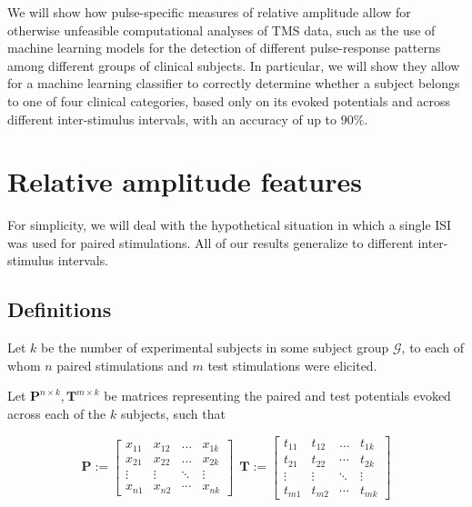 \documentclass{article}
\begin{document}
\begin{multicols}{2}
We will show how pulse-specific measures of relative amplitude allow for
otherwise unfeasible computational analyses of TMS data, such as the use of
machine learning models for the detection of different pulse-response patterns
among different groups of clinical subjects. In particular, we will show they
allow for a machine learning classifier to correctly determine whether a
subject belongs to one of four clinical categories, based only on its evoked
potentials and across different inter-stimulus intervals, with an accuracy of up to
$90\%$.

\section{Relative amplitude features}

For simplicity, we will deal with the hypothetical situation
in which a single ISI was used for paired stimulations. All
of our results generalize to different inter-stimulus intervals.

\subsection{Definitions}

Let $k$ be the number of experimental subjects in some
subject group $\mathcal{G}$, to each of whom $n$ paired stimulations and
$m$ test stimulations were elicited.

\begin{definition}

Let $\textbf{P}^{n \times k}, \textbf{T}^{m\times k}$ be matrices representing
the paired and test potentials evoked across each of the $k$ subjects, such that  

\begin{equation*} \textbf{P} := \begin{bmatrix}x_{11} &
    x_{12}& \ldots & x_{1k} \\ x_{21} & x_{22}& \ldots &
    x_{2k} \\ \vdots & \vdots &\ddots& \vdots \\ x_{n1} & x_{n2}& \cdots & x_{nk}
\end{bmatrix} ~~ \textbf{T}:= \begin{bmatrix}t_{11} &
t_{12}& \ldots & t_{1k} \\ t_{21} & t_{22}& \cdots & t_{2k} \\
      \vdots & \vdots &\ddots& \vdots \\ t_{m1} & t_{m2}& \cdots & t_{mk}
\end{bmatrix} \end{equation*} \end{definition}



\end{multicols}
\end{document}
